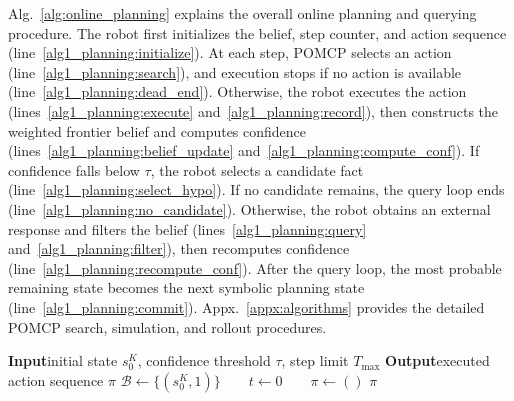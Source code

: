 Alg.~\ref{alg:online_planning} explains the overall online planning and querying procedure. The robot first initializes the belief, step counter, and action sequence (line~\ref{alg1_planning:initialize}). At each step, POMCP selects an action (line~\ref{alg1_planning:search}), and execution stops if no action is available (line~\ref{alg1_planning:dead_end}). Otherwise, the robot executes the action  (lines~\ref{alg1_planning:execute} and~\ref{alg1_planning:record}), then constructs the weighted frontier belief and computes confidence (lines~\ref{alg1_planning:belief_update} and~\ref{alg1_planning:compute_conf}). If confidence falls below $\tau$, the robot selects a candidate fact (line~\ref{alg1_planning:select_hypo}). If no candidate remains, the query loop ends (line~\ref{alg1_planning:no_candidate}). Otherwise, the robot obtains an external response and filters the belief (lines~\ref{alg1_planning:query} and~\ref{alg1_planning:filter}), then recomputes confidence (line~\ref{alg1_planning:recompute_conf}). After the query loop, the most probable remaining state becomes the next symbolic planning state (line~\ref{alg1_planning:commit}).  Appx.~\ref{appx:algorithms} provides the detailed POMCP search, simulation, and rollout procedures.

\begin{algorithm}[t]
\caption{Belief-Guided State Verification and Planning}
\label{alg:online_planning}
\DontPrintSemicolon
\textbf{Input}\quad initial state $s_0^{K}$, confidence threshold $\tau$, step limit $T_{\max}$\;
\textbf{Output}\quad executed action sequence $\pi$\;
\BlankLine
$\mathcal{B}\gets\{(s_0^{K},1)\}\qquad t\gets0\qquad \pi\gets()$\label{alg1_planning:initialize}\;
\KwRet $\pi$\label{alg1_planning:return}\;
\end{algorithm}

